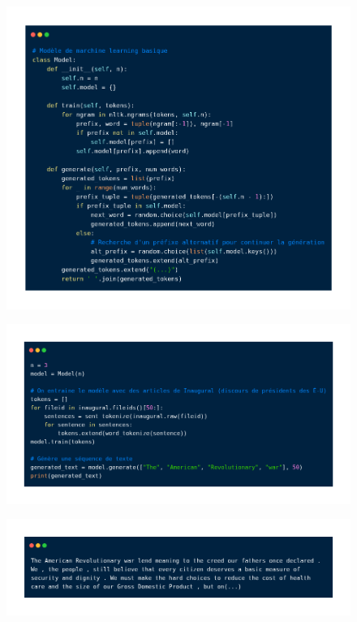 \begin{frame}{\subsecname}
\begin{figure}[ht]
\includegraphics[scale=.27]{img/markov1_nltk.png}
\end{figure}
\end{frame}

\begin{frame}{\subsecname}
\begin{figure}[ht]
\includegraphics[scale=.31]{img/markov2_nltk.png}

\end{figure}
\end{frame}

\begin{frame}{\subsecname}
\begin{figure}[ht]
\includegraphics[scale=.33]{img/markov_output_nltk.png}
\end{figure}
\end{frame}

